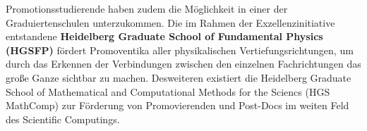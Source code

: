 Promotionsstudierende haben zudem die Möglichkeit in einer der Graduiertenschulen unterzukommen. 
Die im Rahmen der Exzellenzinitiative entstandene \textbf{Heidelberg Graduate School of Fundamental Physics (HGSFP)} fördert Promoventika aller physikalischen Vertiefungsrichtungen, um durch das Erkennen der Verbindungen zwischen den einzelnen Fachrichtungen das große Ganze sichtbar zu machen.
Desweiteren existiert die Heidelberg Graduate School of Mathematical and Computational Methods for the Sciencs (HGS MathComp) zur Förderung von Promovierenden und Post-Docs im weiten Feld des Scientific Computings.

%
%